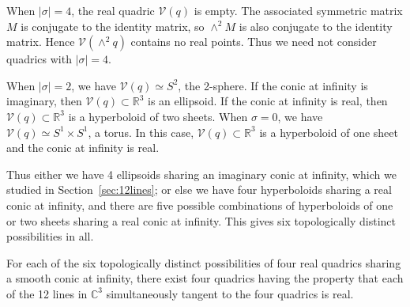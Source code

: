When $|\sigma|=4$, the real quadric ${\mathcal V}(q)$ is empty.
The associated symmetric matrix $M$ is conjugate to the identity
matrix, so $\wedge^2M$ is also conjugate to the identity matrix.
Hence ${\mathcal V}(\wedge^2q)$ contains no real points.
Thus we need not consider quadrics with $|\sigma|=4$.

When $|\sigma|=2$, we have ${\mathcal V}(q)\simeq S^2$, the 2-sphere.
If the conic at infinity is imaginary, then 
${\mathcal V}(q)\subset{\mathbb R}^3$ is an ellipsoid.
If the conic at infinity is real, then ${\mathcal V}(q)\subset{\mathbb R}^3$ is 
a hyperboloid of two sheets.
When $\sigma=0$, we have ${\mathcal V}(q)\simeq S^1\times S^1$, a torus.
In this case, ${\mathcal V}(q)\subset{\mathbb R}^3$ is 
a hyperboloid of one sheet and the conic at infinity is real.

Thus either we have 4 ellipsoids sharing an imaginary conic at infinity,
which we studied in Section~\ref{sec:12lines}; or else we have four
hyperboloids sharing a real conic at infinity, and there are five 
possible combinations of hyperboloids of one or two sheets sharing a real
conic at infinity.
This gives six topologically distinct possibilities in all.


\begin{theorem}
For each of the six topologically distinct possibilities of four real
quadrics sharing a smooth conic at infinity, there exist four quadrics
having the property that each of the 12 lines in ${\mathbb C}^3$
simultaneously tangent to the four quadrics is real.
\end{theorem}

